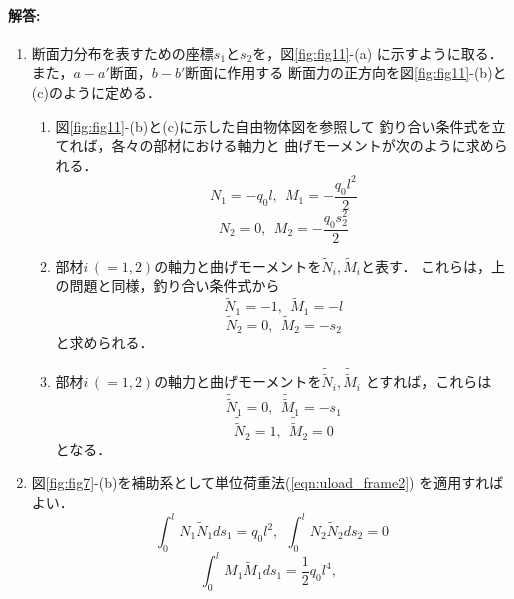 \documentclass[10pt,a4j]{jarticle}
\begin{document}
\paragraph{解答:}
\begin{enumerate}
\item
	断面力分布を表すための座標$s_1$と$s_2$を，図\ref{fig:fig11}-(a)
	に示すように取る．また，$a-a'$断面，$b-b'$断面に作用する
	断面力の正方向を図\ref{fig:fig11}-(b)と(c)のように定める．
	\begin{enumerate}
	\item
		図\ref{fig:fig11}-(b)と(c)に示した自由物体図を参照して
		釣り合い条件式を立てれば，各々の部材における軸力と
		曲げモーメントが次のように求められる．
		\begin{equation}
		N_1=-q_0l, \ \ M_1=-\frac{q_0l^2}{2}
		\label{eqn:}
		\end{equation}
		\begin{equation}
		N_2=0, \ \ M_2=-\frac{q_0s_2^2}{2}
		\label{eqn:}
		\end{equation}
	\item
		部材$i\,(=1,2)$の軸力と曲げモーメントを$\tilde N_i, \tilde M_i$と表す．
		これらは，上の問題と同様，釣り合い条件式から
		\begin{equation}
		\tilde N_1=-1, \ \ \tilde M_1=-l
		\label{eqn:}
		\end{equation}
		\begin{equation}
		\tilde N_2=0, \ \ \tilde M_2=-s_2
		\label{eqn:}
		\end{equation}
		と求められる．	
	\item
		部材$i\, (=1,2)$の軸力と曲げモーメントを$\tilde {\tilde N}_i, \tilde{\tilde M}_i$
		とすれば，これらは
		\begin{equation}
			\tilde{\tilde N}_1=0, \ \ \tilde{\tilde M}_1=-s_1
		\label{eqn:}
		\end{equation}
		\begin{equation}
			\tilde{\tilde N}_2=1, \ \ \tilde{\tilde M}_2=0
		\label{eqn:}
		\end{equation}
		となる．
	\end{enumerate}
\item
	図\ref{fig:fig7}-(b)を補助系として単位荷重法(\ref{eqn:uload_frame2})
	を適用すればよい．
	\begin{equation}
		\int_0^l N_1\tilde N_1ds_1=q_0l^2, \ \ 
		\int_0^l N_2\tilde N_2ds_2=0
		\label{eqn:}
	\end{equation}
	\begin{equation}
		\int_0^l M_1\tilde M_1ds_1=\frac{1}{2}q_0l^4, \ \ 

\end{equation}
\end{enumerate}
\end{document}
